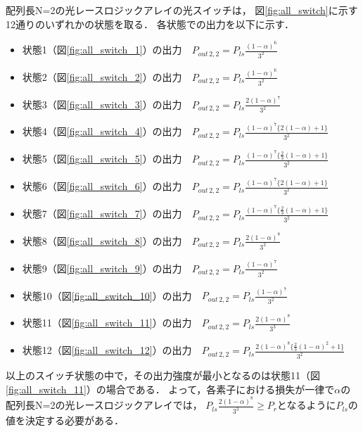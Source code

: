 配列長N=2の光レースロジックアレイの光スイッチは，
図\ref{fig:all_switch}に示す12通りのいずれかの状態を取る．
各状態での出力を以下に示す．
\begin{itemize}
\item 状態1（図\ref{fig:all_switch_1}）の出力　$P_{out\,2,2}=P_{ls}\frac{(1-\alpha)^6}{3^2}$\\
\item 状態2（図\ref{fig:all_switch_2}）の出力　$P_{out\,2,2}=P_{ls}\frac{(1-\alpha)^6}{3^2}$\\
\item 状態3（図\ref{fig:all_switch_3}）の出力　$P_{out\,2,2}=P_{ls}\frac{2(1-\alpha)^7}{3^2}$\\
\item 状態4（図\ref{fig:all_switch_4}）の出力　$P_{out\,2,2}=P_{ls}\frac{(1-\alpha)^7\bigl\{2(1-\alpha)+1\bigl\}}{3^2}$\\
\item 状態5（図\ref{fig:all_switch_5}）の出力　$P_{out\,2,2}=P_{ls}\frac{(1-\alpha)^7\bigl\{\frac{2}{3}(1-\alpha)+1\bigl\}}{3^2}$\\
\item 状態6（図\ref{fig:all_switch_6}）の出力　$P_{out\,2,2}=P_{ls}\frac{(1-\alpha)^7\bigl\{2(1-\alpha)+1\bigl\}}{3^2}$\\
\item 状態7（図\ref{fig:all_switch_7}）の出力　$P_{out\,2,2}=P_{ls}\frac{(1-\alpha)^7\bigl\{\frac{2}{3}(1-\alpha)+1\bigl\}}{3^2}$\\
\item 状態8（図\ref{fig:all_switch_8}）の出力　$P_{out\,2,2}=P_{ls}\frac{2(1-\alpha)^8}{3^2}$\\
\item 状態9（図\ref{fig:all_switch_9}）の出力　$P_{out\,2,2}=P_{ls}\frac{(1-\alpha)^7}{3^2}$\\
\item 状態10（図\ref{fig:all_switch_10}）の出力　$P_{out\,2,2}=P_{ls}\frac{(1-\alpha)^7}{3^2}$\\
\item 状態11（図\ref{fig:all_switch_11}）の出力　$P_{out\,2,2}=P_{ls}\frac{2(1-\alpha)^8}{3^3}$\\
\item 状態12（図\ref{fig:all_switch_12}）の出力　$P_{out\,2,2}=P_{ls}\frac{2(1-\alpha)^8\bigl\{\frac{2}{3}(1-\alpha)^2+1\bigl\}}{3^2}$\\
\end{itemize}

以上のスイッチ状態の中で，その出力強度が最小となるのは状態11（図\ref{fig:all_switch_11}）の場合である．
よって，各素子における損失が一律で$\alpha$の
配列長N=2の光レースロジックアレイでは，
$P_{ls}\frac{2(1-\alpha)^8}{3^3} \geq P_{r}$となるように$P_{ls}$の値を決定する必要がある．

